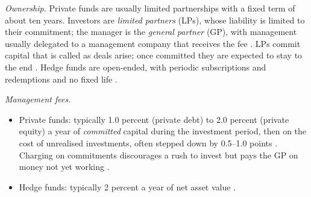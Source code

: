 \begin{qfdefinition}\label{def:alternative-fund-terms}
 \emph{Ownership.} Private funds are usually limited partnerships with a fixed term of about ten years. Investors are \emph{limited partners} (LPs), whose liability is limited to their commitment; the manager is the \emph{general partner} (GP), with management usually delegated to a management company that receives the fee \citep[pp.~13--15]{ippolito-private-capital-2020}. LPs commit capital that is called as deals arise; once committed they are expected to stay to the end \citep[p.~594]{s7-ang}. Hedge funds are open-ended, with periodic subscriptions and redemptions and no fixed life \citep[pp.~6--7]{metrick-yasuda-survey-2011}.

\emph{Management fees.}
\begin{itemize}
\item Private funds: typically 1.0 percent (private debt) to 2.0 percent (private equity) a year of \emph{committed} capital during the investment period, then on the cost of unrealised investments, often stepped down by 0.5--1.0 points \citep[pp.~15--16]{ippolito-private-capital-2020}. Charging on commitments discourages a rush to invest but pays the GP on money not yet working \citep[p.~611]{s7-ang}.
\item Hedge funds: typically 2 percent a year of net asset value \citep[p.~581]{s7-ang}.
\end{itemize}


\end{qfdefinition}
